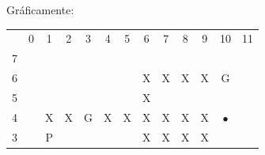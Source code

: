 \documentclass[11pt]{exam}
\begin{document}
Gráficamente:

\begin{table}[H]
	\centering
	\begin{tabular}{ccccccccccccc}
		&
		0 &
		1 &
		2 &
		3 &
		4 &
		5 &
		6 &
		7 &
		8 &
		9 &
		10 &
		11 \\ \cline{2-9}
		\multicolumn{1}{c|}{7} &
		\multicolumn{1}{c|}{\cellcolor[HTML]{000000}} &
		\multicolumn{1}{c|}{\cellcolor[HTML]{000000}} &
		\multicolumn{1}{c|}{\cellcolor[HTML]{000000}} &
		\multicolumn{1}{c|}{\cellcolor[HTML]{000000}} &
		\multicolumn{1}{c|}{\cellcolor[HTML]{000000}} &
		\multicolumn{1}{c|}{\cellcolor[HTML]{000000}} &
		\multicolumn{1}{c|}{\cellcolor[HTML]{000000}} &
		\multicolumn{1}{c|}{\cellcolor[HTML]{000000}} &
		\cellcolor[HTML]{000000} &
		\cellcolor[HTML]{000000} &
		\cellcolor[HTML]{000000} &
		\cellcolor[HTML]{000000} \\ \cline{2-12}
		\multicolumn{1}{c|}{6} &
		\multicolumn{1}{c|}{\cellcolor[HTML]{000000}} &
		\multicolumn{1}{c|}{} &
		\multicolumn{1}{c|}{} &
		\multicolumn{1}{c|}{} &
		\multicolumn{1}{c|}{} &
		\multicolumn{1}{c|}{} &
		\multicolumn{1}{c|}{X} &
		\multicolumn{1}{c|}{X} &
		\multicolumn{1}{c|}{X} &
		\multicolumn{1}{c|}{X} &
		\multicolumn{1}{c|}{G} &
		\cellcolor[HTML]{000000} \\ \cline{2-12}
		\multicolumn{1}{c|}{5} &
		\multicolumn{1}{c|}{\cellcolor[HTML]{000000}} &
		\multicolumn{1}{c|}{} &
		\multicolumn{1}{c|}{} &
		\multicolumn{1}{c|}{} &
		\multicolumn{1}{c|}{} &
		\multicolumn{1}{c|}{} &
		\multicolumn{1}{c|}{X} &
		\multicolumn{1}{c|}{\cellcolor[HTML]{000000}} &
		\multicolumn{1}{c|}{\cellcolor[HTML]{000000}} &
		\multicolumn{1}{c|}{\cellcolor[HTML]{000000}} &
		\multicolumn{1}{c|}{\cellcolor[HTML]{000000}} &
		\cellcolor[HTML]{000000} \\ \cline{2-12}
		\multicolumn{1}{c|}{4} &
		\multicolumn{1}{c|}{\cellcolor[HTML]{000000}} &
		\multicolumn{1}{c|}{X} &
		\multicolumn{1}{c|}{X} &
		\multicolumn{1}{c|}{G} &
		\multicolumn{1}{c|}{X} &
		\multicolumn{1}{c|}{X} &
		\multicolumn{1}{c|}{X} &
		\multicolumn{1}{c|}{X} &
		\multicolumn{1}{c|}{X} &
		\multicolumn{1}{c|}{X} &
		\multicolumn{1}{c|}{$\bullet$} &
		\cellcolor[HTML]{000000} \\ \cline{2-12}
		\multicolumn{1}{c|}{3} &
		\multicolumn{1}{c|}{\cellcolor[HTML]{000000}} &
		\multicolumn{1}{c|}{P} &
		\multicolumn{1}{c|}{} &
		\multicolumn{1}{c|}{} &
		\multicolumn{1}{c|}{} &
		\multicolumn{1}{c|}{} &
		\multicolumn{1}{c|}{X} &
		\multicolumn{1}{c|}{X} &
		\multicolumn{1}{c|}{X} &
		\multicolumn{1}{c|}{X} &

\end{tabular}
\end{table}
\end{document}
